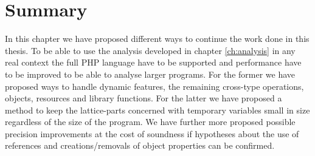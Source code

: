 \section{Summary}
In this chapter we have proposed different ways to continue the work done in this thesis. To be able to use the analysis developed in chapter \ref{ch:analysis} in any real context the full PHP language have to be supported and performance have to be improved to be able to analyse larger programs. For the former we have proposed ways to handle dynamic features, the remaining cross-type operations, objects, resources and library functions. For the latter we have proposed a method to keep the lattice-parts concerned with temporary variables small in size regardless of the size of the program. We have further more proposed possible precision improvements at the cost of soundness if hypotheses about the use of references and creations/removals of object properties can be confirmed.  